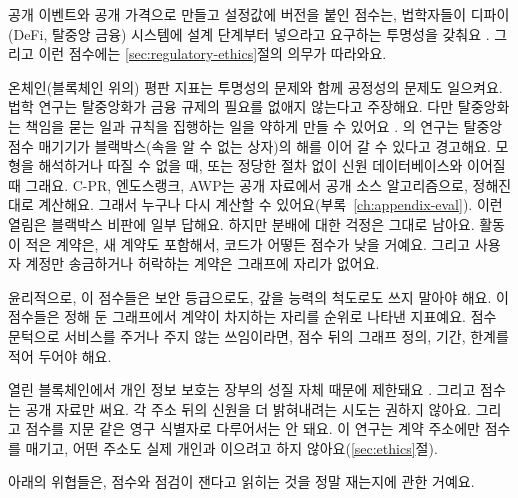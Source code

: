 공개 이벤트와 공개 가격으로 만들고 설정값에 버전을 붙인 점수는, 법학자들이 디파이(DeFi, 탈중앙 금융) 시스템에 설계 단계부터 넣으라고 요구하는 투명성을 갖춰요 \parencite{zetzsche2020defi}. 그리고 이런 점수에는 \ref{sec:regulatory-ethics}절의 의무가 따라와요.


온체인(블록체인 위의) 평판 지표는 투명성의 문제와 함께 공정성의 문제도 일으켜요. 법학 연구는 탈중앙화가 금융 규제의 필요를 없애지 않는다고 주장해요. 다만 탈중앙화는 책임을 묻는 일과 규칙을 집행하는 일을 약하게 만들 수 있어요 \parencite{zetzsche2020defi}. \textcite{packin2024credit}의 연구는 탈중앙 점수 매기기가 블랙박스(속을 알 수 없는 상자)의 해를 이어 갈 수 있다고 경고해요. 모형을 해석하거나 따질 수 없을 때, 또는 정당한 절차 없이 신원 데이터베이스와 이어질 때 그래요. \mbox{C-PR}, 엔도스랭크, AWP는 공개 자료에서 공개 소스 알고리즘으로, 정해진 대로 계산해요. 그래서 누구나 다시 계산할 수 있어요(부록~\ref{ch:appendix-eval}). 이런 열림은 블랙박스 비판에 일부 답해요. 하지만 분배에 대한 걱정은 그대로 남아요. 활동이 적은 계약은, 새 계약도 포함해서, 코드가 어떻든 점수가 낮을 거예요. 그리고 사용자 계정만 송금하거나 허락하는 계약은 그래프에 자리가 없어요.

윤리적으로, 이 점수들은 보안 등급으로도, 갚을 능력의 척도로도 쓰지 말아야 해요. 이 점수들은 정해 둔 그래프에서 계약이 차지하는 자리를 순위로 나타낸 지표예요. 점수 문턱으로 서비스를 주거나 주지 않는 쓰임이라면, 점수 뒤의 그래프 정의, 기간, 한계를 적어 두어야 해요.

열린 블록체인에서 개인 정보 보호는 장부의 성질 자체 때문에 제한돼요 \parencite{nakamoto2008bitcoin}. 그리고 점수는 공개 자료만 써요. 각 주소 뒤의 신원을 더 밝혀내려는 시도는 권하지 않아요. 그리고 점수를 지문 같은 영구 식별자로 다루어서는 안 돼요. 이 연구는 계약 주소에만 점수를 매기고, 어떤 주소도 실제 개인과 이으려고 하지 않아요(\ref{sec:ethics}절).



아래의 위협들은, 점수와 점검이 잰다고 읽히는 것을 정말 재는지에 관한 거예요.

